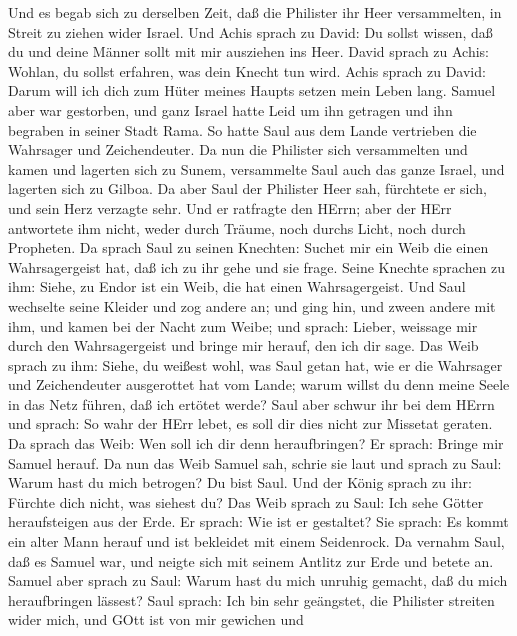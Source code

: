  Und es begab sich zu derselben Zeit, daß die Philister ihr
Heer versammelten, in Streit zu ziehen wider Israel. Und Achis sprach zu
David: Du sollst wissen, daß du und deine Männer sollt mit mir ausziehen
ins Heer.  David sprach zu Achis: Wohlan, du sollst
erfahren, was dein Knecht tun wird. Achis sprach zu David: Darum will
ich dich zum Hüter meines Haupts setzen mein Leben lang. 
Samuel aber war gestorben, und ganz Israel hatte Leid um ihn getragen
und ihn begraben in seiner Stadt Rama. So hatte Saul aus dem Lande
vertrieben die Wahrsager und Zeichendeuter.  Da nun die
Philister sich versammelten und kamen und lagerten sich zu Sunem,
versammelte Saul auch das ganze Israel, und lagerten sich zu Gilboa.
 Da aber Saul der Philister Heer sah, fürchtete er sich, und
sein Herz verzagte sehr.  Und er ratfragte den HErrn; aber
der HErr antwortete ihm nicht, weder durch Träume, noch durchs Licht,
noch durch Propheten.  Da sprach Saul zu seinen Knechten:
Suchet mir ein Weib die einen Wahrsagergeist hat, daß ich zu ihr gehe
und sie frage. Seine Knechte sprachen zu ihm: Siehe, zu Endor ist ein
Weib, die hat einen Wahrsagergeist.  Und Saul wechselte
seine Kleider und zog andere an; und ging hin, und zween andere mit ihm,
und kamen bei der Nacht zum Weibe; und sprach: Lieber, weissage mir
durch den Wahrsagergeist und bringe mir herauf, den ich dir sage.
 Das Weib sprach zu ihm: Siehe, du weißest wohl, was Saul
getan hat, wie er die Wahrsager und Zeichendeuter ausgerottet hat vom
Lande; warum willst du denn meine Seele in das Netz führen, daß ich
ertötet werde?  Saul aber schwur ihr bei dem HErrn und
sprach: So wahr der HErr lebet, es soll dir dies nicht zur Missetat
geraten.  Da sprach das Weib: Wen soll ich dir denn
heraufbringen? Er sprach: Bringe mir Samuel herauf.  Da nun
das Weib Samuel sah, schrie sie laut und sprach zu Saul: Warum hast du
mich betrogen? Du bist Saul.  Und der König sprach zu ihr:
Fürchte dich nicht, was siehest du? Das Weib sprach zu Saul: Ich sehe
Götter heraufsteigen aus der Erde.  Er sprach: Wie ist er
gestaltet? Sie sprach: Es kommt ein alter Mann herauf und ist bekleidet
mit einem Seidenrock. Da vernahm Saul, daß es Samuel war, und neigte
sich mit seinem Antlitz zur Erde und betete an.  Samuel
aber sprach zu Saul: Warum hast du mich unruhig gemacht, daß du mich
heraufbringen lässest? Saul sprach: Ich bin sehr geängstet, die
Philister streiten wider mich, und GOtt ist von mir gewichen und
